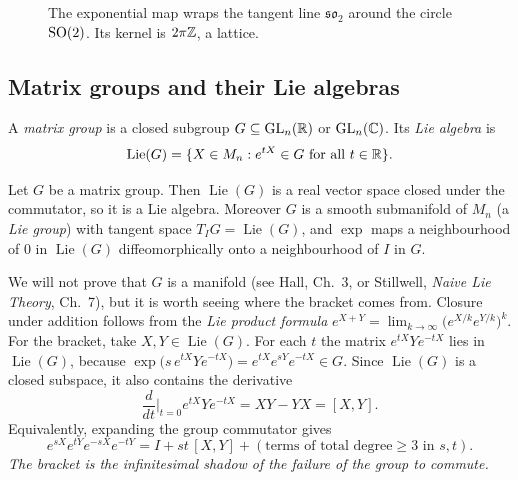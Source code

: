 \begin{figure}[ht]
\centering
{}
\caption{The exponential map wraps the tangent line $\mathfrak{so}_2$ around the circle $\mathrm{SO}(2)$.
Its kernel is $2\pi\mathbb{Z}$, a lattice.}
\label{LIE:fig:so2}
\end{figure}

\subsection*{Matrix groups and their Lie algebras}

\begin{definition}
A \emph{matrix group} is a closed subgroup $G\subseteq\mathrm{GL}_n(\mathbb{R})$ or $\mathrm{GL}_n(\mathbb{C})$. Its \emph{Lie algebra} is
\[
  \operatorname{Lie}(G)=\{X\in M_n: e^{tX}\in G\text{ for all }t\in\mathbb{R}\}.
\]
\end{definition}

\begin{theorem}\label{LIE:thm:closed}
Let $G$ be a matrix group. Then $\operatorname{Lie}(G)$ is a real vector space closed under the commutator,
so it is a Lie algebra. Moreover $G$ is a smooth submanifold of $M_n$ (a \emph{Lie group}) with tangent
space $T_IG=\operatorname{Lie}(G)$, and $\exp$ maps a neighbourhood of $0$ in $\operatorname{Lie}(G)$
diffeomorphically onto a neighbourhood of $I$ in $G$.
\end{theorem}

We will not prove that $G$ is a manifold (see Hall, Ch.~3, or Stillwell, \emph{Naive Lie Theory}, Ch.~7), but it is worth seeing where the bracket comes from. Closure under addition follows from the
\emph{Lie product formula} $e^{X+Y}=\lim_{k\to\infty}\big(e^{X/k}e^{Y/k}\big)^k$. For the bracket, take
$X,Y\in\operatorname{Lie}(G)$. For each $t$ the matrix $e^{tX}Ye^{-tX}$ lies in $\operatorname{Lie}(G)$, because
$\exp\!\big(s\,e^{tX}Ye^{-tX}\big)=e^{tX}e^{sY}e^{-tX}\in G$. Since $\operatorname{Lie}(G)$ is a closed
subspace, it also contains the derivative
\[
  \frac{d}{dt}\Big|_{t=0}e^{tX}Ye^{-tX}=XY-YX=[X,Y].
\]
Equivalently, expanding the group commutator gives
\[
  e^{sX}e^{tY}e^{-sX}e^{-tY}=I+st\,[X,Y]+(\text{terms of total degree}\ge3\text{ in }s,t).
\]
\emph{The bracket is the infinitesimal shadow of the failure of the group to commute.}

